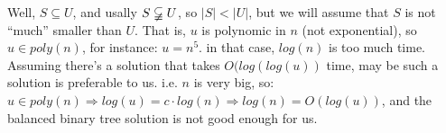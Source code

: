 \documentclass[11pt]{book}
\begin{document}
\begin{minipage}{0.5\textwidth}
\end{minipage}
\EP
Well, $S\subseteq U$, and usally $S\varsubsetneqq U$, so $|S|<|U|$, 
but we will assume that $S$ is not ``much'' smaller than $U$. That is, 
$u$ is polynomic in $n$ (not exponential), so $u\in poly(n)$, 
for instance: $u=n^5$. in that case, $log(n)$ is too much time. 
Assuming there's a solution that takes $O(log(log(u))$ time, 
may be such a solution is preferable to us. i.e. $n$ is very big, 
so: $u\in poly(n)\Longrightarrow log(u)=c\cdot{}log(n)\Longrightarrow log(n)=O(log(u))$, 
and the balanced binary tree solution is not good enough for us.
\end{document}
